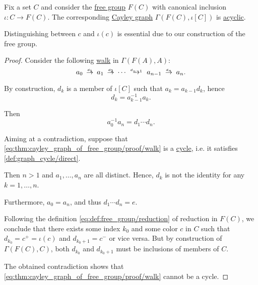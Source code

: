 \begin{proposition}\label{thm:cayley_graph_of_free_group}
  Fix a set \( C \) and consider the \hyperref[def:free_group]{free group} \( F(C) \) with canonical inclusion \( \iota: C \to F(C) \). The corresponding \hyperref[def:cayley_graph]{Cayley graph} \( \Gamma(F(C), \iota[C]) \) is \hyperref[def:acyclic_graph]{acyclic}.
\end{proposition}
\begin{comments}
  \item Distinguishing between \( c \) and \( \iota(c) \) is essential due to our construction of the free group.
\end{comments}
\begin{proof}
  Consider the following \hyperref[def:graph_walk]{walk} in \( \Gamma(F(A), A) \):
  \begin{equation}\label{eq:thm:cayley_graph_of_free_group/proof/walk}
    a_0 \reloset {d_1} \to a_1 \reloset {d_2} \to \cdots \reloset {d_{n-1}} \to a_{n-1} \reloset {d_n} \to a_n.
  \end{equation}

  By construction, \( d_k \) is a member of \( \iota[C] \) such that \( a_k = a_{k-1} d_k \), hence
  \begin{equation*}
    d_k = a_{k-1}^{-1} a_k.
  \end{equation*}

  Then
  \begin{equation*}
    a_0^{-1} a_n = d_1 \cdots d_n.
  \end{equation*}

  Aiming at a contradiction, suppose that \eqref{eq:thm:cayley_graph_of_free_group/proof/walk} is a \hyperref[def:graph_cycle]{cycle}, i.e. it satisfies \cref{def:graph_cycle/direct}.

  Then \( n > 1 \) and \( a_1, \ldots, a_n \) are all distinct. Hence, \( d_k \) is not the identity for any \( k = 1, \ldots, n \).

  Furthermore, \( a_0 = a_n \), and thus \( d_1 \cdots d_n = e \).

  Following the definition \eqref{eq:def:free_group/reduction} of reduction in \( F(C) \), we conclude that there exists some index \( k_0 \) and some color \( c \) in \( C \) such that \( d_{k_0} = c^+ = \iota(c) \) and \( d_{k_0 + 1} = c^- \) or vice versa. But by construction of \( \Gamma(F(C), C) \), both \( d_{k_0} \) and \( d_{k_0 + 1} \) must be inclusions of members of \( C \).

  The obtained contradiction shows that \eqref{eq:thm:cayley_graph_of_free_group/proof/walk} cannot be a cycle.
\end{proof}

